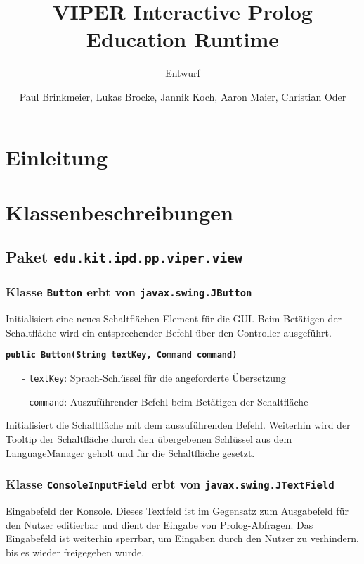 \documentclass[parskip=full,11pt,twoside]{scrartcl}
\title{VIPER Interactive Prolog Education Runtime}
\subtitle{Entwurf}
\author{Paul Brinkmeier, Lukas Brocke, Jannik Koch, Aaron Maier, Christian Oder}
\begin{document}
\maketitle

\section{Einleitung}

\section{Klassenbeschreibungen}

\subsection{Paket \texttt{edu.kit.ipd.pp.viper.view}}

\subsubsection{Klasse \texttt{Button} erbt von \texttt{javax.swing.JButton}}

Initialisiert eine neues Schaltflächen-Element für die GUI. Beim Betätigen der Schaltfläche wird ein entsprechender Befehl über den Controller ausgeführt.

\textbf{\texttt{public Button(String textKey, Command command)}}
\begin{itemize}[noitemsep]
	\item[-] \texttt{textKey}: Sprach-Schlüssel für die angeforderte Übersetzung
	\item[-] \texttt{command}: Auszuführender Befehl beim Betätigen der Schaltfläche
\end{itemize}
Initialisiert die Schaltfläche mit dem auszuführenden Befehl. Weiterhin wird der Tooltip der Schaltfläche durch den übergebenen Schlüssel aus dem LanguageManager geholt und für die Schaltfläche gesetzt.

\subsubsection{Klasse \texttt{ConsoleInputField} erbt von \texttt{javax.swing.JTextField}}

Eingabefeld der Konsole. Dieses Textfeld ist im Gegensatz zum Ausgabefeld für den Nutzer editierbar und dient der Eingabe von Prolog-Abfragen. Das Eingabefeld ist weiterhin sperrbar, um Eingaben durch den Nutzer zu verhindern, bis es wieder freigegeben wurde.
\end{document}
